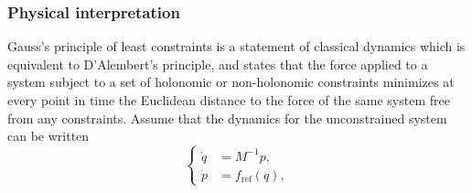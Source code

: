 \documentclass[pdflatex,sn-mathphys]{sn-jnl}%
\theoremstyle{thmstyleone}%
\theoremstyle{thmstyletwo}%
\theoremstyle{thmstylethree}%
\newcommand{\1}{\mathbbm{1}}
\begin{document}
\subsubsection{Physical interpretation}
Gauss's principle of least constraints is a statement of classical dynamics which is equivalent to D'Alembert's principle, and states that the force applied to a system subject to a set of holonomic or non-holonomic constraints minimizes at every point in time the Euclidean distance to the force of the same system free from any constraints.
Assume that the dynamics for the unconstrained system can be written
\begin{equation}
    \left\{
    \begin{aligned}
        \dot q &= M^{-1}p,\\
        \dot p &= f_{\mathrm{ref}}(q),
    \end{aligned}
    \right.
\end{equation}

\end{document}
